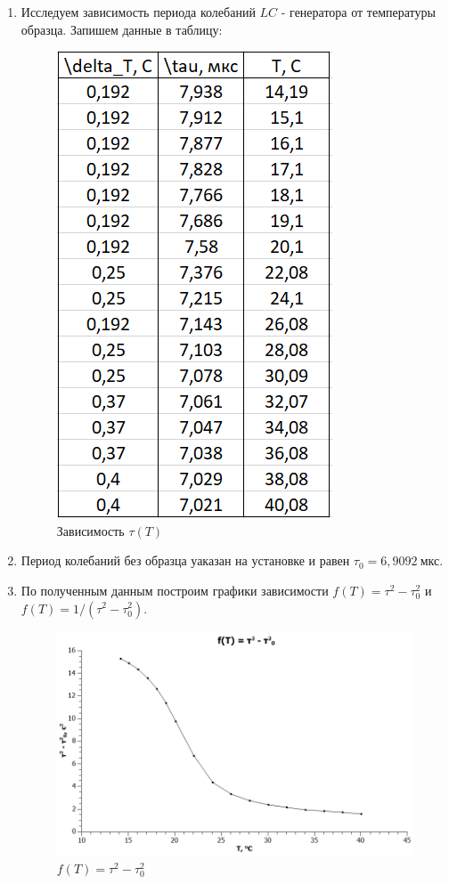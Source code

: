 \documentclass[a4paper, 12pt]{article}%
\begin{document}
\begin{enumerate}

\item Исследуем зависимость периода колебаний $LC$ - генератора от температуры образца. Запишем данные в таблицу:

\begin{figure}[h!]
\centering
\includegraphics[scale = 1.4]{images/table_t(T).png}
\caption{Зависимость $\tau (T)$}
\label{fig:Image3}
\end{figure}

\item Период колебаний без образца уаказан на установке и равен $\tau_0 = 6,9092 \: \text{мкс}$.

\item По полученным данным построим графики зависимости $f(T) = \tau^2 - \tau^2_0$ и $f(T) = 1/(\tau^2 - \tau^2_0)$.

\begin{figure}[h!]
\centering
\includegraphics[scale = 0.8]{images/graph1.png}
\caption{$f(T) = \tau^2 - \tau^2_0$}
\label{fig:Image3}
\end{figure}


\end{enumerate}
\end{document}
